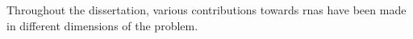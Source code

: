 
Throughout the dissertation, various contributions towards
\glspl{rna} have been made in different dimensions of the
problem.
